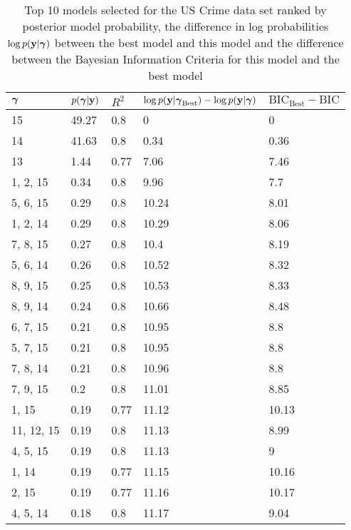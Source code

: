 \documentclass{amsart}
\begin{document}
\begin{table}
\label{tab:numerical_results_uscrime}
\caption{Top 10 models selected for the US Crime data set ranked by posterior model probability, the
					difference in log probabilities $\log p({\bf y}|{\boldsymbol \gamma})$ between the best model and this model and the difference between the Bayesian Information Criteria for this model and the best model}
\begin{tabular}{|l|llll|}
\hline
${\boldsymbol \gamma}$ & $p({\boldsymbol \gamma}|{\bf y})$ & $R^2$ & $\log p({\bf y} | {\boldsymbol \gamma}_\text{Best}) - \log p({\bf y} | {\boldsymbol \gamma})$ & $\text{BIC}_\text{Best} - \text{BIC}$ \\
\hline
15&  49.27&  0.8&  0&  0\\
14&  41.63&  0.8&  0.34&  0.36\\
13&  1.44&  0.77&  7.06&  7.46\\
1, 2, 15&  0.34&  0.8&  9.96&  7.7\\
5, 6, 15&  0.29&  0.8&  10.24&  8.01\\
1, 2, 14&  0.29&  0.8&  10.29&  8.06\\
7, 8, 15&  0.27&  0.8&  10.4&  8.19\\
5, 6, 14&  0.26&  0.8&  10.52&  8.32\\
8, 9, 15&  0.25&  0.8&  10.53&  8.33\\
8, 9, 14&  0.24&  0.8&  10.66&  8.48\\
6, 7, 15&  0.21&  0.8&  10.95&  8.8\\
5, 7, 15&  0.21&  0.8&  10.95&  8.8\\
7, 8, 14&  0.21&  0.8&  10.96&  8.8\\
7, 9, 15&  0.2&  0.8&  11.01&  8.85\\
1, 15&  0.19&  0.77&  11.12&  10.13\\
11, 12, 15&  0.19&  0.8&  11.13&  8.99\\
4, 5, 15&  0.19&  0.8&  11.13&  9\\
1, 14&  0.19&  0.77&  11.15&  10.16\\
2, 15&  0.19&  0.77&  11.16&  10.17\\
4, 5, 14&  0.18&  0.8&  11.17&  9.04\\
\hline
\end{tabular}
\end{table}
\end{document}

